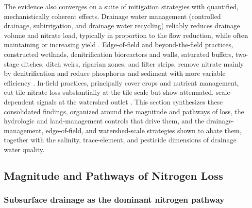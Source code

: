 \documentclass[11pt]{article}
\begin{document}
The evidence also converges on a suite of mitigation strategies with
quantified, mechanistically coherent effects. Drainage water management
(controlled drainage, subirrigation, and drainage water recycling)
reliably reduces drainage volume and nitrate load, typically in
proportion to the flow reduction, while often maintaining or increasing
yield \parencite{Skaggs2010,Youssef2018,Wu2025,Madramootoo2024}.
Edge-of-field and beyond-the-field practices, constructed wetlands,
denitrification bioreactors and walls, saturated buffers, two-stage
ditches, ditch weirs, riparian zones, and filter strips, remove nitrate
mainly by denitrification and reduce phosphorus and sediment with more
variable efficiency \parencite{Tanner2005,Jaynes2008,Hodaj2017,Strock2025b,JACOBS1985}.
In-field practices, principally cover crops and nutrient management, cut
tile nitrate loss substantially at the tile scale but show attenuated,
scale-dependent signals at the watershed outlet
\parencite{Hanrahan2018,Speir2022,Gentry2014}. This section synthesizes
these consolidated findings, organized around the magnitude and pathways
of loss, the hydrologic and land-management controls that drive them, and
the drainage-management, edge-of-field, and watershed-scale strategies
shown to abate them, together with the salinity, trace-element, and
pesticide dimensions of drainage water quality.

\subsection{Magnitude and Pathways of Nitrogen Loss}

\subsubsection{Subsurface drainage as the dominant nitrogen pathway}
\end{document}
